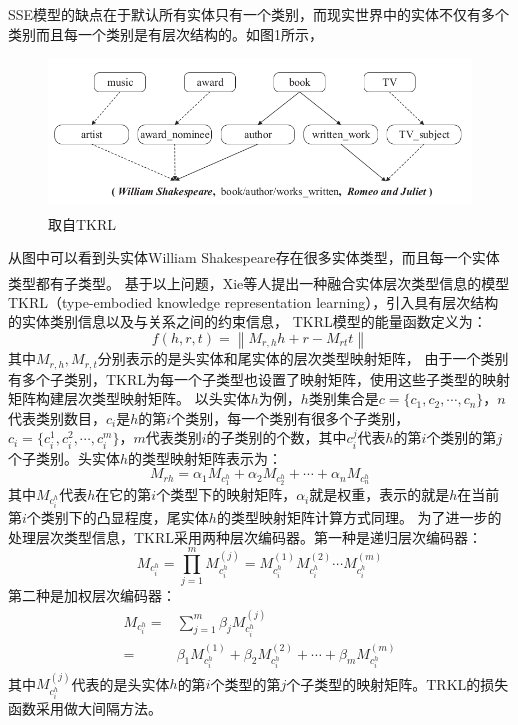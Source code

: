 \documentclass[twocolumn]{article}
\newcommand{\upcite}[1]{\textsuperscript{\textsuperscript{\cite{#1}}}}
\begin{document}
	SSE模型的缺点在于默认所有实体只有一个类别，而现实世界中的实体不仅有多个类别而且每一个类别是有层次结构的。如图1所示，
	\begin{figure}[ht]
		\centering
		\includegraphics[width=\linewidth]{TKRL.png}
		\caption{取自TKRL\upcite{TKRL}}
	\end{figure}
	从图中可以看到头实体William Shakespeare存在很多实体类型，而且每一个实体类型都有子类型。
	基于以上问题，Xie等人\upcite{TKRL}提出一种融合实体层次类型信息的模型TKRL（type-embodied knowledge representation learning），引入具有层次结构的实体类别信息以及与关系之间的约束信息，
	TKRL模型的能量函数定义为：
	\begin{equation}
		f(h,r,t)=\left \| M_{r,h}h+r-M_{rt}t \right \|
	\end{equation}
	其中$M_{r,h},M_{r,t}$分别表示的是头实体和尾实体的层次类型映射矩阵，
	由于一个类别有多个子类别，TKRL为每一个子类型也设置了映射矩阵，使用这些子类型的映射矩阵构建层次类型映射矩阵。
	以头实体$h$为例，$h$类别集合是$c=\{c_1,c_2,\cdots,c_n\}$，$n$代表类别数目，$c_i$是$h$的第$i$个类别，每一个类别有很多个子类别，$c_i=\{c_i^1,c_i^2,\cdots,c_i^m\}$，$m$代表类别$i$的子类别的个数，其中$c_i^j$代表$h$的第$i$个类别的第$j$个子类别。头实体$h$的类型映射矩阵表示为：
	\begin{equation}
		M_{rh}=\alpha_1 M_{c_1^h}+\alpha_2 M_{c_2^h}+\cdots+\alpha_n M_{c_n^h}
	\end{equation}
	其中$M_{c_i^h}$代表$h$在它的第$i$个类型下的映射矩阵，$\alpha_i$就是权重，表示的就是$h$在当前第$i$个类别下的凸显程度，尾实体$h$的类型映射矩阵计算方式同理。
	为了进一步的处理层次类型信息，TKRL采用两种层次编码器。第一种是递归层次编码器：
	\begin{equation}
		M_{c_i^h}=\prod_{j=1}^{m}M_{c_i^h}^{(j)}=M_{c_i^h}^{(1)}M_{c_i^h}^{(2)}\cdots M_{c_i^h}^{(m)}
	\end{equation}
	第二种是加权层次编码器：
	\begin{equation}
		\begin{split}
		M_{c_i^h}=&\sum_{j=1}^{m}\beta_jM_{c_i^h}^{(j)}\\
		=&\beta_1M_{c_i^h}^{(1)}+\beta_2M_{c_i^h}^{(2)}+\cdots+\beta_mM_{c_i^h}^{(m)}
		\end{split}
	\end{equation}
	其中$M_{c_i^h}^{(j)}$代表的是头实体$h$的第$i$个类型的第$j$个子类型的映射矩阵。TRKL的损失函数采用做大间隔方法。
	
\end{document}
